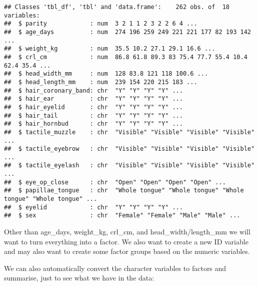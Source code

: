 \documentclass[
]{article}
\newenvironment{Shaded}{\begin{snugshade}}{\end{snugshade}}
\newcommand{\KeywordTok}[1]{\textcolor[rgb]{0.13,0.29,0.53}{\textbf{#1}}}
\newcommand{\NormalTok}[1]{#1}
\newcommand{\OperatorTok}[1]{\textcolor[rgb]{0.81,0.36,0.00}{\textbf{#1}}}
\newcommand{\StringTok}[1]{\textcolor[rgb]{0.31,0.60,0.02}{#1}}
\begin{document}
\begin{Shaded}
\end{Shaded}

\begin{verbatim}
## Classes 'tbl_df', 'tbl' and 'data.frame':    262 obs. of  18 variables:
##  $ parity            : num  3 2 1 1 2 3 2 2 6 4 ...
##  $ age_days          : num  274 196 259 249 221 221 177 82 193 142 ...
##  $ weight_kg         : num  35.5 10.2 27.1 29.1 16.6 ...
##  $ crl_cm            : num  86.8 61.8 89.3 83 75.4 77.7 55.4 10.4 62.4 35.4 ...
##  $ head_width_mm     : num  128 83.8 121 118 100.6 ...
##  $ head_length_mm    : num  239 154 220 215 183 ...
##  $ hair_coronary_band: chr  "Y" "Y" "Y" "Y" ...
##  $ hair_ear          : chr  "Y" "Y" "Y" "Y" ...
##  $ hair_eyelid       : chr  "Y" "Y" "Y" "Y" ...
##  $ hair_tail         : chr  "Y" "Y" "Y" "Y" ...
##  $ hair_hornbud      : chr  "Y" "Y" "Y" "Y" ...
##  $ tactile_muzzle    : chr  "Visible" "Visible" "Visible" "Visible" ...
##  $ tactile_eyebrow   : chr  "Visible" "Visible" "Visible" "Visible" ...
##  $ tactile_eyelash   : chr  "Visible" "Visible" "Visible" "Visible" ...
##  $ eye_op_close      : chr  "Open" "Open" "Open" "Open" ...
##  $ papillae_tongue   : chr  "Whole tongue" "Whole tongue" "Whole tongue" "Whole tongue" ...
##  $ eyelid            : chr  "Y" "Y" "Y" "Y" ...
##  $ sex               : chr  "Female" "Female" "Male" "Male" ...
\end{verbatim}

Other than age\_days, weight\_kg, crl\_cm, and head\_width/length\_mm we
will want to turn everything into a factor. We also want to create a new
ID variable and may also want to create some factor groups based on the
numeric variables.

We can also automatically convert the character variables to factors and
summarise, just to see what we have in the data:

\begin{Shaded}
\end{Shaded}
\end{document}
